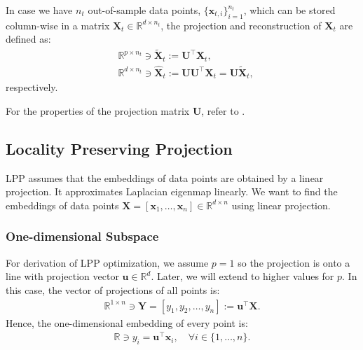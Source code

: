 \documentclass[lang=cn,10pt]{gorgeousnbook}
\numberwithin{equation}{section}%
\numberwithin{figure}{section}%
\begin{document}
In case we have $n_t$ out-of-sample data points, $\{\boldsymbol{x}_{t,i}\}_{i=1}^{n_t}$, which can be stored column-wise in a matrix $\boldsymbol{X}_t \in \mathbb{R}^{d \times n_t}$, the projection and reconstruction of $\boldsymbol{X}_t$ are defined as:
\begin{align}
&\mathbb{R}^{p \times n_t} \ni \widetilde{\boldsymbol{X}}_t := \boldsymbol{U}^\top \boldsymbol{X}_t, \label{equation_projection_outOfSample_SeveralPoints_severalDirections} \\
&\mathbb{R}^{d \times n_t} \ni \widehat{\boldsymbol{X}}_t := \boldsymbol{U}\boldsymbol{U}^\top \boldsymbol{X}_t = \boldsymbol{U} \widetilde{\boldsymbol{X}}_t, \label{equation_reconstruction_outOfSample_SeveralPoints_severalDirections}
\end{align}
respectively.

For the properties of the projection matrix $\boldsymbol{U}$, refer to \cite{ghojogh2019unsupervised}.

\subsection{Locality Preserving Projection}

LPP assumes that the embeddings of data points are obtained by a linear projection. It approximates Laplacian eigenmap linearly. We want to find the embeddings of data points $\boldsymbol{X} = [\boldsymbol{x}_1, \dots, \boldsymbol{x}_n] \in \mathbb{R}^{d \times n}$ using linear projection. 

\subsubsection{One-dimensional Subspace}

For derivation of LPP optimization, we assume $p=1$ so the projection is onto a line with projection vector $\boldsymbol{u} \in \mathbb{R}^d$. Later, we will extend to higher values for $p$. In this case, the vector of projections of all points is:
\begin{align}\label{equation_LPP_projection_to_line}
\mathbb{R}^{1 \times n} \ni \boldsymbol{Y} = [y_1, y_2, \dots, y_n] := \boldsymbol{u}^\top \boldsymbol{X}.
\end{align}
Hence, the one-dimensional embedding of every point is:
\begin{align}\label{equation_LPP_projection_to_line_2}
\mathbb{R} \ni y_i = \boldsymbol{u}^\top \boldsymbol{x}_i, \quad \forall i \in \{1, \dots, n\}.
\end{align}
\end{document}
